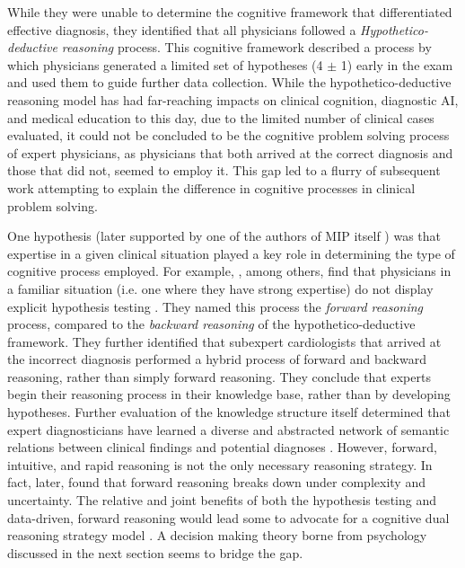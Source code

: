 While they were unable to determine the cognitive framework that differentiated effective diagnosis, they identified that all physicians followed a \emph{Hypothetico-deductive reasoning} process. This cognitive framework described a process by which physicians generated a limited set of hypotheses (4 $\pm$ 1) early in the exam and used them to guide further data collection. While the hypothetico-deductive reasoning model has had far-reaching impacts on clinical cognition, diagnostic AI, and medical education to this day, due to the limited number of clinical cases evaluated, it could not be concluded to be the cognitive problem solving process of expert physicians, as physicians that both arrived at the correct diagnosis and those that did not, seemed to employ it. This gap led to a flurry of subsequent work attempting to explain the difference in cognitive processes in clinical problem solving. 

One hypothesis (later supported by one of the authors of MIP itself \citep{elsteinThinkingDiagnosticThinking2009}) was that expertise in a given clinical situation played a key role in determining the type of cognitive process employed. For example, \citep{groenMedicalProblemsolvingQuestionable1985}, among others, find that physicians in a familiar situation (i.e. one where they have strong expertise) do not display explicit hypothesis testing \citep{schmidtCognitivePerspectiveMedical1990, brooksRoleSpecificSimilarity1991, evaExploringEtiologyContent1998}. They named this process the \emph{forward reasoning} process, compared to the \emph{backward reasoning} of the hypothetico-deductive framework. They further identified that subexpert cardiologists that arrived at the incorrect diagnosis performed a hybrid process of forward and backward reasoning, rather than simply forward reasoning. They conclude that experts begin their reasoning process in their knowledge base, rather than by developing hypotheses. Further evaluation of the knowledge structure itself determined that expert diagnosticians have learned a diverse and abstracted network of semantic relations between clinical findings and potential diagnoses \citep{bordageSemanticStructuresDiagnostic1991, patelKnowledgeBasedSolution1986}. However, forward, intuitive, and rapid reasoning is not the only necessary reasoning strategy. In fact, later, \citet{patelMedicalExpertiseFunction1990} found that forward reasoning breaks down under complexity and uncertainty. The relative and joint benefits of both the  hypothesis testing and data-driven, forward reasoning would lead some to advocate for a cognitive dual reasoning strategy model \citep{evaHeuristicsBiasesBiased2005}. A decision making theory borne from psychology discussed in the next section seems to bridge the gap.  

